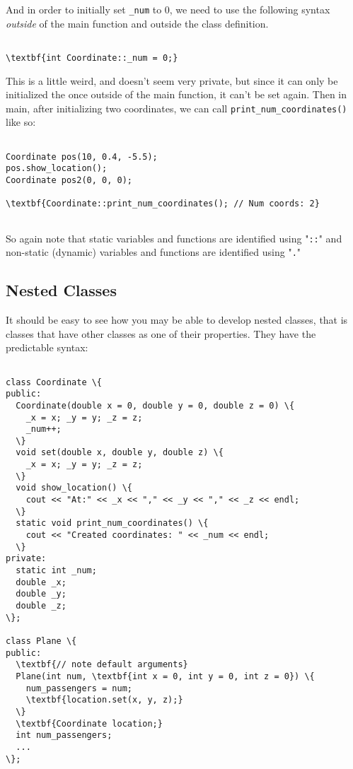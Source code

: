 \documentclass{IEEEtran}
\begin{document}
And in order to initially set \verb|_num| to 0, we need to use the following syntax \textit{outside} of the main function and outside the class definition.

\begin{Verbatim}[fontsize=\scriptsize, xleftmargin=.3in, commandchars=\\\{\}]

\textbf{int Coordinate::_num = 0;}

\end{Verbatim}

This is a little weird, and doesn't seem very private, but since it can only be initialized the once outside of the main function, it can't be set again. Then in main, after initializing two coordinates, we can call \verb|print_num_coordinates()| like so:

\begin{Verbatim}[fontsize=\scriptsize, xleftmargin=.3in, commandchars=\\\{\}]

Coordinate pos(10, 0.4, -5.5);
pos.show_location();
Coordinate pos2(0, 0, 0);

\textbf{Coordinate::print_num_coordinates(); // Num coords: 2}
  
\end{Verbatim}

So again note that static variables and functions are identified using "\verb|::|" and non-static (dynamic) variables and functions are identified using "\verb|.|"

\subsection{Nested Classes}

It should be easy to see how you may be able to develop nested classes, that is classes that have other classes as one of their properties. They have the predictable syntax:

\begin{Verbatim}[fontsize=\scriptsize, xleftmargin=.3in, commandchars=\\\{\}]

class Coordinate \{
public:
  Coordinate(double x = 0, double y = 0, double z = 0) \{ 
    _x = x; _y = y; _z = z;
    _num++;
  \}
  void set(double x, double y, double z) \{
    _x = x; _y = y; _z = z;
  \}
  void show_location() \{
    cout << "At:" << _x << "," << _y << "," << _z << endl;
  \}
  static void print_num_coordinates() \{
    cout << "Created coordinates: " << _num << endl;
  \}
private:
  static int _num;
  double _x;
  double _y;
  double _z;
\};

class Plane \{
public: 
  \textbf{// note default arguments}
  Plane(int num, \textbf{int x = 0, int y = 0, int z = 0}) \{
    num_passengers = num;
    \textbf{location.set(x, y, z);}
  \}
  \textbf{Coordinate location;}
  int num_passengers;
  ...
\};

\end{Verbatim}
\end{document}
